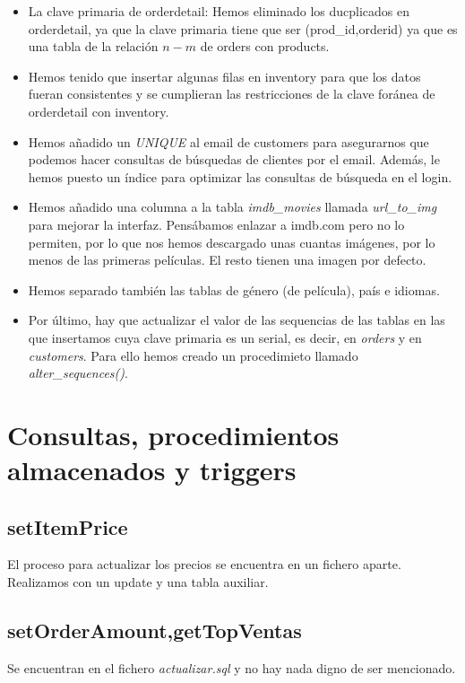 \documentclass[nochap]{apuntes}
\begin{document}
\begin{itemize}

\item La clave primaria de orderdetail: Hemos eliminado los ducplicados en orderdetail, ya que la clave primaria  tiene que ser (prod\_id,orderid) ya que es una tabla de la relación $n-m$ de orders con products. 

\item Hemos tenido que insertar algunas filas en inventory para que los datos fueran consistentes y se cumplieran las restricciones de la clave foránea de orderdetail con inventory.

\item Hemos añadido un \textit{UNIQUE} al email de customers para asegurarnos que podemos hacer consultas de búsquedas de clientes por el email. Además, le hemos puesto un índice para optimizar las consultas de búsqueda en el login.

\item Hemos añadido una columna a la tabla \textit{imdb\_movies} llamada \textit{url\_to\_img} para mejorar la interfaz. Pensábamos enlazar a imdb.com pero no lo permiten, por lo que nos hemos descargado unas cuantas imágenes, por lo menos de las primeras películas. El resto tienen una imagen por defecto.

\item Hemos separado también las tablas de género (de película), país e idiomas. 

\item Por último, hay que actualizar el valor de las sequencias de las tablas en las que insertamos cuya clave primaria es un serial, es decir, en \textit{orders} y en \textit{customers}. Para ello hemos creado un procedimieto llamado \textit{alter\_sequences()}.
\end{itemize}



\section{Consultas, procedimientos almacenados y triggers}
\subsection{setItemPrice}
El proceso para actualizar los precios se encuentra en un fichero aparte. Realizamos con un update y una tabla auxiliar.
\subsection{setOrderAmount,getTopVentas}
Se encuentran en el fichero \textit{actualizar.sql} y no hay nada digno de ser mencionado.
\end{document}
